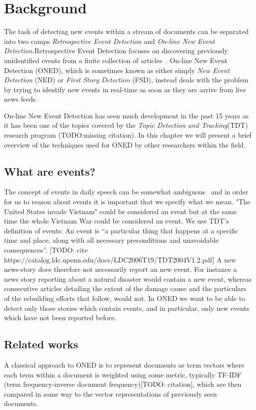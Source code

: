 \chapter{Background}
\label{chapter:background}

The task of detecting new events within a stream of documents can be separated into two camps \emph{Retrospective Event Detection} and \emph{On-line New Event Detection}.Retrospective Event Detection focuses on discovering previously unidentified events from a finite collection of articles~\cite{yang1998study}. On-line New Event Detection (ONED), which is sometimes known as either simply \emph{New Event Detection} (NED) or \emph{First Story Detection} (FSD), instead deals with the problem by trying to identify new events in real-time as soon as they are arrive from live news feeds.

On-line New Event Detection has seen much development in the past 15 years as it has been one of the topics covered by the \emph{Topic Detection and Tracking}(TDT) research program (TODO:missing citation). In this chapter we will present a brief overview of the techniques used for ONED by other researchers within the field.

\section{What are events?}
The concept of events in daily speech can be somewhat ambiguous~\cite{papka1999online} and in order for us to reason about events it is important that we specify what we mean. "The United States invade Vietnam" could be considered an event but at the same time the whole Vietnam War could be considered an event. We use TDT's definition of events: An event is ``a particular thing that happens at a specific time and place, along with all necessary preconditions and unavoidable consequences''. [TODO: cite https://catalog.ldc.upenn.edu/docs/LDC2006T19/TDT2004V1.2.pdf]
A new news-story does therefore not necessarily report an new event. For instance a news story reporting about a natural disaster would contain a new event, whereas consecutive articles detailing the extent of the damage cause and the particulars of the rebuilding efforts that follow, would not. In ONED we want to be able to detect only those stories which contain events, and in particular, only new events which have not been reported before.

\section{Related works}
A classical approach to ONED is to represent documents as term vectors where each term within a document is weighted using some metric, typically TF-IDF (term frequency-inverse document frequency)[TODO: citation], which are then compared in some way to the vector representations of previously seen documents.

